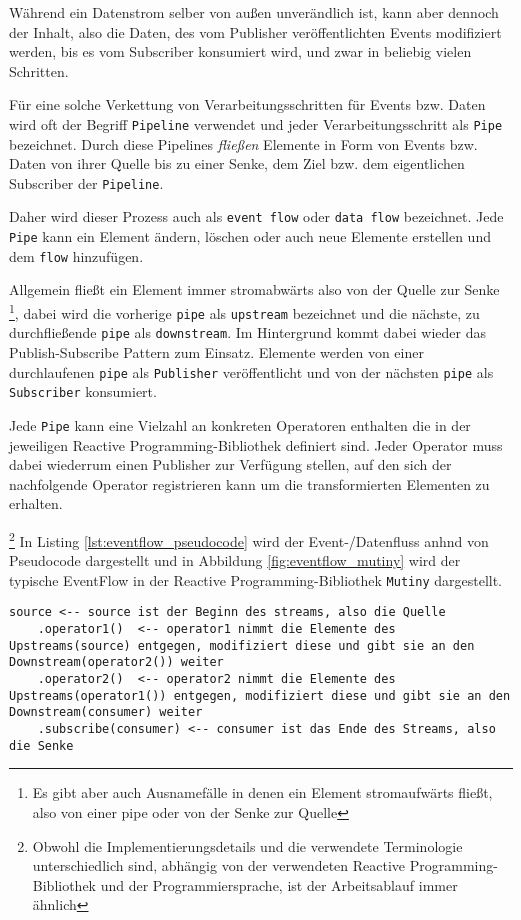 Während ein Datenstrom selber von außen unverändlich ist, kann aber dennoch der Inhalt, also die Daten,
des vom Publisher veröffentlichten Events modifiziert werden, bis es vom
Subscriber konsumiert wird, und zwar in beliebig vielen Schritten.

Für eine solche Verkettung von Verarbeitungsschritten für Events bzw. Daten
wird oft der Begriff \verb|Pipeline| verwendet und jeder Verarbeitungsschritt als \verb|Pipe| bezeichnet.
Durch diese Pipelines \textit{fließen} Elemente in Form von Events bzw. Daten von ihrer Quelle
bis zu einer Senke, dem Ziel bzw. dem eigentlichen Subscriber der \verb|Pipeline|.

Daher wird dieser Prozess auch als \verb|event flow| oder \verb|data flow| bezeichnet.
Jede \verb|Pipe| kann ein Element ändern, löschen oder auch neue Elemente erstellen und dem \verb|flow| hinzufügen.

Allgemein fließt ein Element immer stromabwärts also von der Quelle zur Senke
\footnote{Es gibt aber auch Ausnamefälle in denen ein Element stromaufwärts fließt, also von einer pipe oder von der Senke zur Quelle},
dabei wird die vorherige \verb|pipe| als \verb|upstream| bezeichnet und die nächste, zu durchfließende \verb|pipe| als \verb|downstream|.
Im Hintergrund kommt dabei wieder das Publish-Subscribe Pattern zum Einsatz. Elemente werden von einer durchlaufenen \verb|pipe| als \verb|Publisher|
veröffentlicht und von der nächsten \verb|pipe| als \verb|Subscriber| konsumiert.

Jede \verb|Pipe| kann eine Vielzahl an konkreten Operatoren enthalten die in der jeweiligen Reactive Programming-Bibliothek definiert sind.
Jeder Operator muss dabei wiederrum einen Publisher zur Verfügung stellen, auf den sich der nachfolgende Operator registrieren kann
um die transformierten Elementen zu erhalten.

\footnote{Obwohl die Implementierungsdetails und die verwendete Terminologie unterschiedlich sind, abhängig von der verwendeten Reactive Programming-Bibliothek
	und der Programmiersprache, ist der Arbeitsablauf immer ähnlich}
In Listing \ref{lst:eventflow_pseudocode} wird der Event-/Datenfluss anhnd von Pseudocode dargestellt und in Abbildung \ref{fig:eventflow_mutiny}
wird der typische EventFlow in der Reactive Programming-Bibliothek \verb|Mutiny| dargestellt.
\begin{lstlisting}[caption=Pseudocode Event-/Datenfluss, captionpos=b, label=lst:eventflow_pseudocode]
source <-- source ist der Beginn des streams, also die Quelle
	.operator1()  <-- operator1 nimmt die Elemente des Upstreams(source) entgegen, modifiziert diese und gibt sie an den Downstream(operator2()) weiter
	.operator2()  <-- operator2 nimmt die Elemente des Upstreams(operator1()) entgegen, modifiziert diese und gibt sie an den Downstream(consumer) weiter
	.subscribe(consumer) <-- consumer ist das Ende des Streams, also die Senke
\end{lstlisting}

